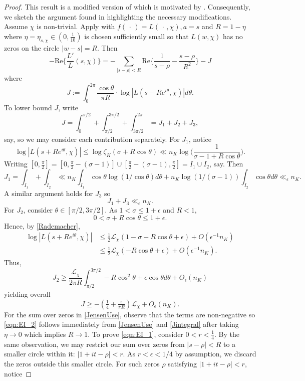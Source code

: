 \documentclass[12pt,psamsfonts]{amsart}
\theoremstyle{definition}
\theoremstyle{remark}
\numberwithin{equation}{section}
\theoremstyle{plain}
\theoremstyle{remark}
\renewcommand{\1}{ {\bf 1}}
\newcommand{\cL}{\mathcal{L}}
\renewcommand{\Re}{\mathrm{Re}}
\begin{document}
\begin{proof} This result is a modified version of \cite[Lemma 4.3]{Zaman_2015a} which is motivated by \cite[Lemma 3.1]{HBLinnik}. Consequently, we sketch the argument found in \cite{Zaman_2015a} highlighting the necessary modifications. Assume $\chi$ is non-trivial.  Apply \cite[Lemma 3.2]{HBLinnik} with $f( \, \cdot \,) = L(\, \cdot \, ,\chi), a=s$ and $R = 1-\eta$ where $\eta = \eta_{s,\chi} \in (0,\tfrac{1}{10})$ is chosen sufficiently small so that $L(w,\chi)$ has no zeros on the circle $|w-s| = R$. Then
\begin{equation}
-\Re \Big\{ \frac{L'}{L}(s,\chi) \Big\} = -\sum_{|s-\rho| < R} \Re\Big\{ \frac{1}{s-\rho} - \frac{s-\rho}{R^2} \Big\} - J
\label{JensenUse}
\end{equation}
where
\[
J :=  \int_0^{2\pi} \frac{\cos \theta}{\pi R} \cdot \log| L(s+ R e^{i\theta},\chi)|d\theta.
\]
To lower bound $J$, write
\[
J = \int_0^{\pi/2} + \int_{\pi/2}^{3\pi/2} + \int_{3\pi/2}^{2\pi} = J_1 + J_2 + J_3, 
\]
say, so we may consider each contribution separately. For $J_1$, notice
\[
\log| L(s+ R e^{i\theta},\chi)| \leq \log \zeta_K(\sigma+ R\cos \theta) \ll n_K \log\Big( \frac{1}{\sigma-1 + R\cos \theta}\Big).
\]
Writing $[0,\tfrac{\pi}{2}] = [0,\tfrac{\pi}{2} - (\sigma-1)] \cup [\tfrac{\pi}{2}-(\sigma-1), \tfrac{\pi}{2}] = I_1 \cup I_2$, say. Then 
\[
J_1 = \int_{I_1} + \int_{I_2} \ll n_K \int_{I_1} \cos \theta \log(1/\cos \theta) d\theta + n_K \log(1/(\sigma-1)) \int_{I_2} \cos \theta d\theta \ll_{\epsilon} n_K.
\]
A similar argument holds for $J_3$ so 
\[
J_1 + J_3 \ll_{\epsilon} n_K.
\]
For $J_2$, consider $\theta \in [\pi/2, 3\pi/2]$. As $1 < \sigma \leq 1 + \epsilon$ and $R < 1$,
\[
0 < \sigma + R\cos\theta \leq 1+ \epsilon.
\]
Hence, by \cref{Rademacher}, 
\begin{align*}
 \log|L(s+Re^{i\theta},\chi)| 
 & \leq \tfrac{1}{2} \cL_{\chi} (1-\sigma- R \cos\theta + \epsilon) + O(\epsilon^{-1}n_K)    \\
 & \leq \tfrac{1}{2}  \cL_{\chi}( -R \cos\theta + \epsilon) +  O(\epsilon^{-1}n_K).
\end{align*}
Thus,
\[
J_2 \geq \frac{\cL_{\chi}}{2 \pi R} \int_{\pi/2}^{3\pi/2} -R \cos^2 \theta + \epsilon \cos \theta d\theta + O_{\epsilon}(n_K) 
\]
yielding overall
\begin{equation}
J \geq  - ( \tfrac{1}{4}+ \tfrac{\epsilon}{\pi R} )\cL_{\chi}  + O_{\epsilon}(n_K).
\label{Jintegral}
\end{equation}
For the sum over zeros in \eqref{JensenUse}, observe that the terms are non-negative so \eqref{eqn:EI_2} follows immediately from \eqref{JensenUse} and \eqref{Jintegral} after taking $\eta \rightarrow 0$ which implies $R \rightarrow 1$.  To prove \eqref{eqn:EI_1}, consider $0 < r  <  \tfrac{1}{4}$. By the same observation, we may restrict our sum over zeros from $|s-\rho| < R$ to a smaller circle within it: $|1+it-\rho| < r$. As $r < \epsilon < 1/4$ by assumption, we discard the zeros outside this smaller circle. For such zeros $\rho$ satisfying $|1+it-\rho| < r$, notice

\end{proof}
\end{document}
